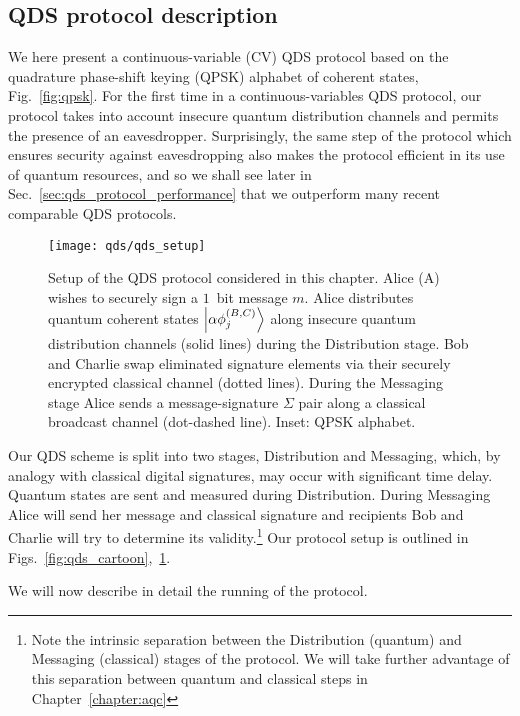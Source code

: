 \subsection{QDS protocol description}

We here present a continuous-variable (CV) QDS protocol based on the quadrature phase-shift keying (QPSK) alphabet of coherent states, Fig.~\ref{fig:qpsk}. 
For the first time in a continuous-variables QDS protocol, our protocol takes into account insecure quantum distribution channels and permits the presence of an eavesdropper. Surprisingly, the same step of the protocol which ensures security against eavesdropping also makes the protocol efficient in its use of quantum resources, and so we shall see later in Sec.~\ref{sec:qds_protocol_performance} that we outperform many recent comparable QDS protocols.

\begin{figure}[htp]
\centering
\texttt{[image: qds/qds\_setup]}
\caption{\label{fig:qds_setup} Setup of the QDS protocol considered in this chapter. Alice (A) wishes to securely sign a $1$~bit message $m$. Alice distributes quantum coherent states $\ket{\alpha \phi_j^{\left(B, C\right)}}$ along insecure quantum distribution channels (solid lines) during the Distribution stage. Bob and Charlie swap eliminated signature elements via their securely encrypted classical channel (dotted lines). During the Messaging stage Alice sends a message-signature $\Sigma$ pair along a classical broadcast channel (dot-dashed line). Inset: QPSK alphabet. }
\end{figure}


Our QDS scheme is split into two stages, Distribution and Messaging, which, by analogy with classical digital signatures, may occur with significant time delay. Quantum states are sent and measured during Distribution. During Messaging Alice will send her message and classical signature and recipients Bob and Charlie will try to determine its validity.\footnote{Note the intrinsic separation between the Distribution (quantum) and Messaging (classical) stages of the protocol. We will take further advantage of this separation between quantum and classical steps in Chapter~\ref{chapter:aqc}} Our protocol setup is outlined in Figs.~\ref{fig:qds_cartoon},~\ref{fig:qds_setup}. 
\par
\noindent We will now describe in detail the running of the protocol.



